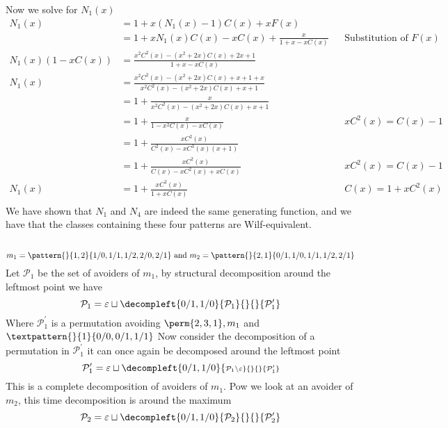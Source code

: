 Now we solve  for \(N_1(x)\)
\begin{equation}
    \begin{aligned}
        N_1(x)&= 1+x(N_1(x)-1)C(x)+xF(x)\\
        &= 1+xN_1(x)C(x)-xC(x)+\frac{x}{1+x-xC(x)} &&\text{Substitution of \(F(x)\)}\\
        N_1(x)(1-xC(x))&= \frac{x^2C^2(x) - (x^2+2x)C(x) + 2x+1}{1+x-xC(x)}\\
        N_1(x) &= \frac{x^2C^2(x) - (x^2+2x)C(x) + x+1+x}{x^2C^2(x) - (x^2+2x)C(x) +x+1}\\
        &= 1 +\frac{x}{x^2C^2(x) - (x^2+2x)C(x) +x+1}\\
        &= 1 + \frac{x}{1-x^2C(x)-xC(x)} && xC^2(x) = C(x)-1\\
        &= 1 + \frac{xC^2(x)}{C^2(x) - xC^3(x)(x+1)}\\
        &= 1 + \frac{xC^2(x)}{C(x) - xC^2(x) + xC(x)} && xC^2(x) = C(x)-1\\
        N_1(x)&= 1 + \frac{xC^2(x)}{1+xC(x)} && C(x) = 1+xC^2(x)\\
    \end{aligned}
\end{equation}
We have shown that \(N_1\) and \(N_4\) are indeed the same generating function,
and we have that the classes containing these four patterns are Wilf-equivalent.

\subsection{}
\begin{equation*}
    m_1 = \pattern{}{1,2}{1/0,1/1,1/2,2/0,2/1} \text{ and }
    m_2 = \pattern{}{2,1}{0/1,1/0,1/1,1/2,2/1}
\end{equation*}
Let \(\mathcal{P}_1\) be the set of avoiders of \(m_1\), by structural decomposition
around the leftmost point we have
\begin{equation*}
    \mathcal{P}_1 = \varepsilon \sqcup
    \decompleft{0/1,1/0}{\mathcal{P}_1}{}{}{\mathcal{P}^\prime_1}
\end{equation*}
Where \(\mathcal{P}^\prime_1\) is a permutation avoiding \(\perm{2,3,1}, m_1\)
and \(\textpattern{}{1}{0/0,0/1,1/1}\)
Now consider the decomposition of a permutation in \(\mathcal{P}^\prime_1\) it can
once again be decomposed around the leftmost point
\begin{equation*}
    \mathcal{P}^\prime_1 = \varepsilon \sqcup
    \decompleft{0/1,1/0}{\scriptstyle \mathcal{P}_1\setminus\varepsilon}{}{}{\mathcal{P}^\prime_1}
\end{equation*}
This is a complete decomposition of avoiders of \(m_1\). Pow we
look at an avoider of \(m_2\), this time decomposition is around the maximum
\begin{equation*}
    \mathcal{P}_2 = \varepsilon \sqcup
    \decompleft{0/1,1/0}{\mathcal{P}_2}{}{}{\mathcal{P}^\prime_2}
\end{equation*}

